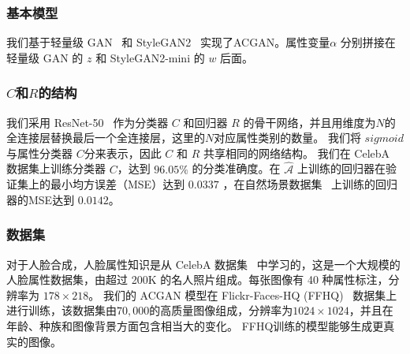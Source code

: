 \subsubsection{基本模型} 
我们基于轻量级 GAN~\cite{lwgan} 和 StyleGAN2~\cite{stylegan2} 实现了ACGAN。属性变量$\alpha$ 分别拼接在 轻量级 GAN 的 $z$ 和 StyleGAN2-mini 的 $w$ 后面。

\subsubsection{$C$和$R$的结构}
我们采用 ResNet-50~\cite{resnet} 作为分类器 $C$ 和回归器 $R$ 的骨干网络，并且用维度为$N$的全连接层替换最后一个全连接层，这里的$N$对应属性类别的数量。 我们将 $sigmoid$ 与属性分类器 $C$分来表示，因此 $C$ 和 $R$ 共享相同的网络结构。 我们在 CelebA 数据集上训练分类器 $C$，达到 $96.05\%$ 的分类准确度。在 $\hat{\mathcal{A}}$ 上训练的回归器在验证集上的最小均方误差（MSE）达到 $0.0337$ ，在自然场景数据集~\cite{scenedataset} 上训练的回归器的MSE达到 $0.0142$。

\subsubsection{数据集}
对于人脸合成，人脸属性知识是从 CelebA 数据集~\cite{celeba} 中学习的，这是一个大规模的人脸属性数据集，由超过 200K 的名人照片组成。每张图像有 40 种属性标注，分辨率为 $178\times218$。 我们的 ACGAN 模型在 Flickr-Faces-HQ (FFHQ)~\cite{stylegan} 数据集上进行训练，该数据集由$70,000$的高质量图像组成，分辨率为$1024\times1024$，并且在年龄、种族和图像背景方面包含相当大的变化。 FFHQ训练的模型能够生成更真实的图像。

